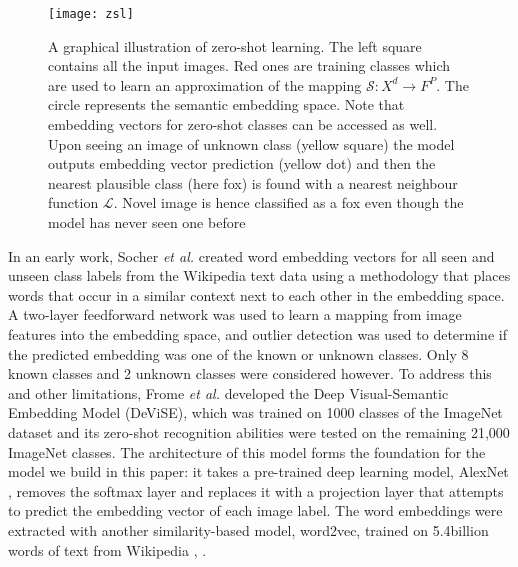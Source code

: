 \documentclass[12pt]{report}
\begin{document}
\begin{figure}
  \centering
	\texttt{[image: zsl]}
	\caption{A graphical illustration of zero-shot learning. The left square contains all the input images. Red ones are training classes which are used to learn an approximation of the mapping $\mathcal{S}:X^d \rightarrow F^P$. The circle represents the semantic embedding space. Note that embedding vectors for zero-shot classes can be accessed as well. Upon seeing an image of unknown class (yellow square) the model outputs embedding vector prediction (yellow dot) and then the nearest plausible class (here fox) is found with a nearest neighbour function $\mathcal{L}$. Novel image is hence classified as a fox even though the model has never seen one before}
	\label{fig:zsl}
\end{figure}

In an early work, Socher \textit{et al.} \cite{Socher} created word embedding vectors for all seen and unseen class labels from the Wikipedia text data using a methodology \cite{Huang2012} that places words that occur in a similar context next to each other in the embedding space. A two-layer feedforward network was used to learn a mapping from image features into the embedding space, and outlier detection was used to determine if the predicted embedding was one of the known or unknown classes. Only 8 known classes and 2 unknown classes were considered however. To address this and other limitations, Frome \textit{et al.} \cite{Frome2013} developed the Deep Visual-Semantic Embedding Model (DeViSE), which was trained on 1000 classes of the ImageNet dataset \cite{JiaDeng2009} and its zero-shot recognition abilities were tested on the remaining 21,000 ImageNet classes. The architecture of this model forms the foundation for the model we build in this paper: it takes a pre-trained deep learning model, AlexNet \cite{Krizhevsky2012}, removes the softmax layer and replaces it with a projection layer that attempts to predict the embedding vector of each image label. The word embeddings were extracted with another similarity-based model, word2vec, trained on 5.4billion words of text from Wikipedia \cite{Mikolov2013}, \cite{Mikolov}. 
\end{document}
